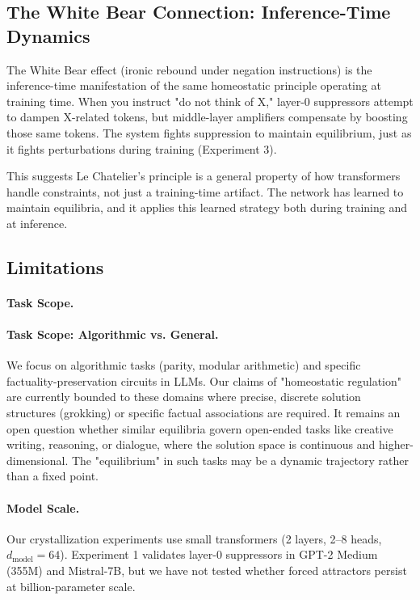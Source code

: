 \subsection{The White Bear Connection: Inference-Time Dynamics}

The White Bear effect (ironic rebound under negation instructions) is the inference-time manifestation of the same homeostatic principle operating at training time. When you instruct "do not think of X," layer-0 suppressors attempt to dampen X-related tokens, but middle-layer amplifiers compensate by boosting those same tokens. The system fights suppression to maintain equilibrium, just as it fights perturbations during training (Experiment 3).

This suggests Le Chatelier's principle is a general property of how transformers handle constraints, not just a training-time artifact. The network has learned to maintain equilibria, and it applies this learned strategy both during training and at inference.

\subsection{Limitations}

\paragraph{Task Scope.}
\paragraph{Task Scope: Algorithmic vs. General.}
We focus on algorithmic tasks (parity, modular arithmetic) and specific factuality-preservation circuits in LLMs. Our claims of "homeostatic regulation" are currently bounded to these domains where precise, discrete solution structures (grokking) or specific factual associations are required. It remains an open question whether similar equilibria govern open-ended tasks like creative writing, reasoning, or dialogue, where the solution space is continuous and higher-dimensional. The "equilibrium" in such tasks may be a dynamic trajectory rather than a fixed point.

\paragraph{Model Scale.}
Our crystallization experiments use small transformers (2 layers, 2--8 heads, $d_{\text{model}}=64$). Experiment 1 validates layer-0 suppressors in GPT-2 Medium (355M) and Mistral-7B, but we have not tested whether forced attractors persist at billion-parameter scale.

